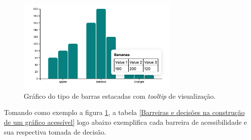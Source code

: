 {{\begin{figure}[ht]
  	\center
    \includegraphics[width=0.7\textwidth]{images/barchart-tooltip.png}
    \caption{Gráfico do tipo de barras estacadas com \textit{tooltip} de visualização.}
    \label{fig:grafico-d3}
\end{figure} 

}


{

{Tomando como exemplo a figura \ref{fig:grafico-d3}, a tabela \ref{Barreiras e decisões na construção de um gráfico acessível} logo abaixo exemplifica cada barreira de acessibilidade e sua respectiva tomada de decisão.}
\vspace*{20px}

}}
